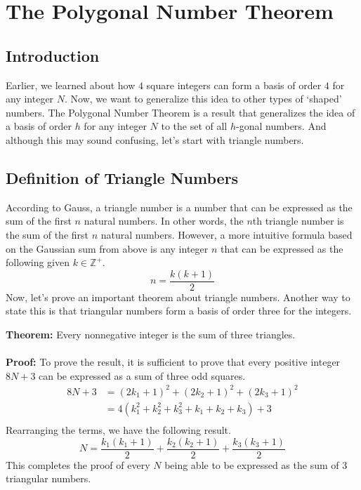 \documentclass[8pt]{extarticle}
\begin{document}
\section{The Polygonal Number Theorem}
\subsection{Introduction}
Earlier, we learned about how $4$ square integers can form a basis of order $4$ for any integer $N$. Now, we want to generalize this idea to other types of `shaped' numbers. The Polygonal Number Theorem is a result that generalizes the idea of a basis of order $h$ for any integer $N$ to the set of all $h$-gonal numbers. And although this may sound confusing, let's start with triangle numbers.
\subsection{Definition of Triangle Numbers}
According to Gauss, a triangle number is a number that can be expressed as the sum of the first $n$ natural numbers. In other words, the $n$th triangle number is the sum of the first $n$ natural numbers. However, a more intuitive formula based on the Gaussian sum from above is any integer $n$ that can be expressed as the following given $k \in \mathbb{Z}^+$.
$$
n = \frac{k(k+1)}{2}
$$
Now, let's prove an important theorem about triangle numbers. Another way to state this is that triangular numbers form a basis of order three for the integers.
\begin{boxedsection}
    \textbf{Theorem:} Every nonnegative integer is the sum of three triangles.\\
    \\
    \textbf{Proof:} To prove the result, it is sufficient to prove that every positive integer $8N + 3$ can be expressed as a sum of three odd squares. 
    \begin{align*}
        8N + 3 &= (2k_1 + 1)^2 + (2k_2 + 1)^2 + (2k_3 + 1)^2 \\
        &= 4(k_1^2 + k_2^2 + k_3^2 + k_1 + k_2 + k_3) + 3\\
    \end{align*}
    Rearranging the terms, we have the following result.
    $$
    N = \frac{k_1(k_1+1)}{2} + \frac{k_2(k_2+1)}{2} + \frac{k_3(k_3+1)}{2}
    $$
    This completes the proof of every $N$ being able to be expressed as the sum of $3$ triangular numbers.
\end{boxedsection}
\end{document}
